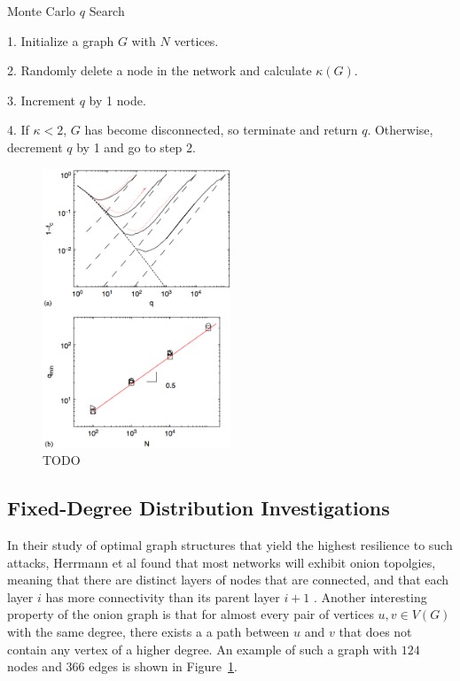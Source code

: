 \documentclass[doc]{apa}%
\begin{document}
\begin{algorithm}
\caption{Monte Carlo $q$ Search}
\label{alg1}
\begin{algorithmic}
	\item 1. Initialize a graph $G$ with $N$ vertices.
	\item 2. Randomly delete a node in the network and calculate $\kappa(G)$.
	\item 3. Increment $q$ by 1 node.
	\item 4. If $\kappa < 2$, $G$ has become disconnected, so terminate and return $q$. Otherwise, decrement $q$ by 1 and go to step 2.
\end{algorithmic}
\end{algorithm}

\begin{figure}[h!]
	\label{fig:Onion}
	\centering
		\includegraphics[width=0.5\textwidth]{fractional_results.png}
	\caption{TODO}
\end{figure}


\subsection{Fixed-Degree Distribution Investigations}


In their study of optimal graph structures that yield the highest resilience to such attacks, Herrmann et al found that most networks will exhibit onion topolgies, meaning that there are distinct layers of nodes that are connected, and that each layer $i$ has more connectivity than its parent layer $i+1$ \cite{Onion}. Another interesting property of the onion graph is that for almost every pair of vertices $u, v \in V(G)$ with the same degree, there exists a a path between $u$ and $v$ that does not contain any vertex of a higher degree. An example of such a graph with $124$ nodes and $366$ edges is shown in Figure~\ref{fig:Onion}.
\end{document}
